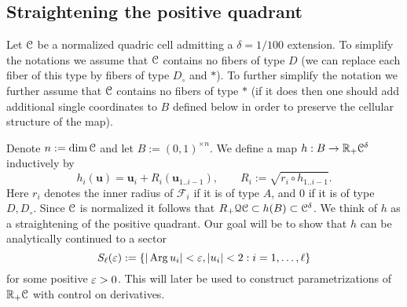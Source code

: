\documentclass[reqno]{amsart}
\renewcommand\~[1]{\widetilde{#1}}
\def\Arg{\operatorname{Arg}} \def\dist{\operatorname{dist}}
\def\cF{{\mathcal F}} \def\cL{{\mathcal L}} \def\cR{{\mathcal R}}
\def\vu{{\mathbf u}}
\def\Qua{\mathcal{Q}}
\begin{document}
\subsection{Straightening the positive quadrant}
\label{sec:quadrant-straighten}

Let ${\mathcal C}$ be a normalized quadric cell admitting a $\delta=1/100$
extension. To simplify the notations we assume that ${\mathcal C}$ contains no
fibers of type $D$ (we can replace each fiber of this type by fibers
of type $D_\circ$ and $*$). To further simplify the notation we
further assume that ${\mathcal C}$ contains no fibers of type $*$ (if it does
then one should add additional single coordinates to $B$ defined below
in order to preserve the cellular structure of the map).

Denote $n:=\dim{\mathcal C}$ and let $B:=(0,1)^{\times n}$.  We define a map
$h:B\to{\mathbb R}_+{\mathcal C}^\delta$ inductively by
\begin{equation}\label{eq:h-def}
  h_i(\vu) = \vu_i+R_i(\vu_{1..i-1}), \qquad R_i:=\sqrt{r_i\circ h_{1..i-1}}.
\end{equation}
Here $r_i$ denotes the inner radius of $\cF_i$ if it is of type $A$,
and $0$ if it is of type $D,D_\circ$. Since ${\mathcal C}$ is normalized it
follows that $R_+\Qua\cC\subset h(B)\subset \cC^\delta$. We think of
$h$ as a straightening of the positive quadrant. Our goal will be to
show that $h$ can be analytically continued to a sector
\begin{equation}
  S_\ell(\e) := \{|\Arg u_i|<\e, |u_i|<2 : i=1,\ldots,\ell\}
\end{equation}
for some positive $\varepsilon>0$. This will later be used to construct
parametrizations of ${\mathbb R}_+{\mathcal C}$ with control on derivatives.
\end{document}

